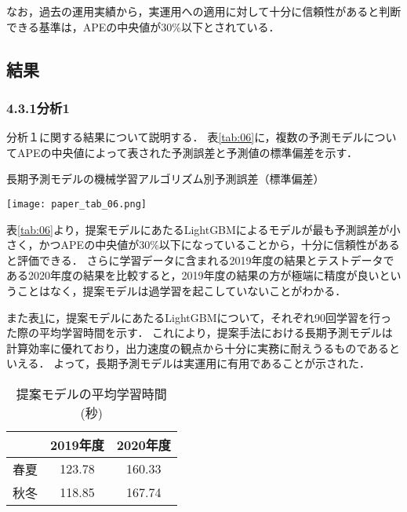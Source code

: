\documentclass[dvipdfmx]{jreport}
\begin{document}
なお，過去の運用実績から，実運用への適用に対して十分に信頼性があると判断できる基準は，APEの中央値が30\%以下とされている．

\subsection{結果}

\subsubsection{4.3.1\hspace{10pt}分析1}
分析１に関する結果について説明する．
表\ref{tab:06}に，複数の予測モデルについてAPEの中央値によって表された予測誤差と予測値の標準偏差を示す．
\begin{table}[h]
    \begin{center}
        \caption{長期予測モデルの機械学習アルゴリズム別予測誤差（標準偏差）} \label{tab:06}
        \texttt{[image: paper\_tab\_06.png]}
    \end{center}
\end{table}

表\ref{tab:06}より，提案モデルにあたるLightGBMによるモデルが最も予測誤差が小さく，かつAPEの中央値が30\%以下になっていることから，十分に信頼性があると評価できる．
さらに学習データに含まれる2019年度の結果とテストデータである2020年度の結果を比較すると，2019年度の結果の方が極端に精度が良いということはなく，提案モデルは過学習を起こしていないことがわかる．

また表\ref{tab:11}に，提案モデルにあたるLightGBMについて，それぞれ90回学習を行った際の平均学習時間を示す．
これにより，提案手法における長期予測モデルは計算効率に優れており，出力速度の観点から十分に実務に耐えうるものであるといえる．
よって，長期予測モデルは実運用に有用であることが示された．
\begin{table}[h]
    \centering
    \caption{提案モデルの平均学習時間(秒)}\label{tab:11}
    \begin{tabular}{|c||c|c|} \hline
        \rowcolor{gray!20} %
         & \textbf{2019年度} & \textbf{2020年度} \\ \hline \hline
        春夏 & 123.78 & 160.33 \\ \hline
        秋冬 & 118.85 & 167.74 \\ \hline
    \end{tabular}
\end{table}
\end{document}
